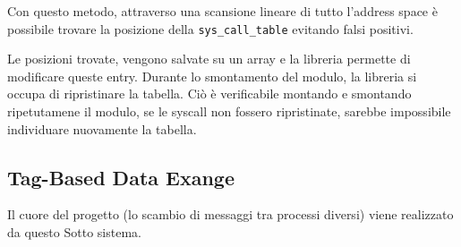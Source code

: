 Con questo metodo, attraverso una scansione lineare di tutto l'address space è possibile trovare la posizione
della \verb|sys_call_table| evitando falsi positivi.

Le posizioni trovate, vengono salvate su un array e la libreria permette di modificare queste entry.
Durante lo smontamento del modulo, la libreria si occupa di ripristinare la tabella. Ciò è verificabile montando e
smontando ripetutamene il modulo, se le syscall non fossero ripristinate, sarebbe impossibile individuare nuovamente la
tabella.
\newpage


\subsection{Tag-Based Data Exange} \label{tbde}

Il cuore del progetto (lo scambio di messaggi tra processi diversi) viene realizzato da questo Sotto sistema.

